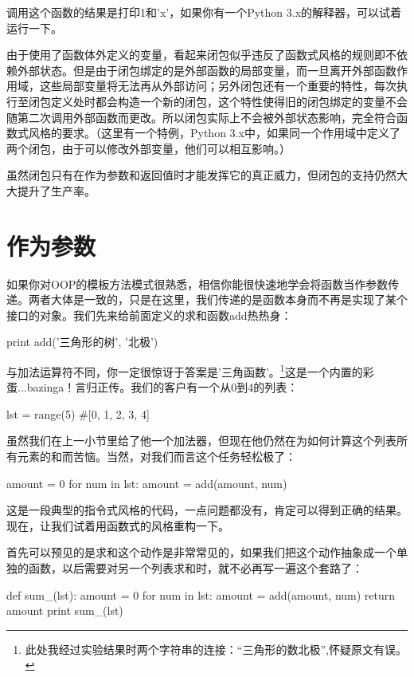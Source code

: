 \documentclass[12pt,a4paper]{report}
\begin{document}
调用这个函数的结果是打印1和'x'，如果你有一个Python 3.x的解释器，可以试着运行一下。

由于使用了函数体外定义的变量，看起来闭包似乎违反了函数式风格的规则即不依赖外部状态。但是由于闭包绑定的是外部函数的局部变量，而一旦离开外部函数作用域，这些局部变量将无法再从外部访问；另外闭包还有一个重要的特性，每次执行至闭包定义处时都会构造一个新的闭包，这个特性使得旧的闭包绑定的变量不会随第二次调用外部函数而更改。所以闭包实际上不会被外部状态影响，完全符合函数式风格的要求。（这里有一个特例，Python 3.x中，如果同一个作用域中定义了两个闭包，由于可以修改外部变量，他们可以相互影响。）

虽然闭包只有在作为参数和返回值时才能发挥它的真正威力，但闭包的支持仍然大大提升了生产率。
\section{作为参数}
如果你对OOP的模板方法模式很熟悉，相信你能很快速地学会将函数当作参数传递。两者大体是一致的，只是在这里，我们传递的是函数本身而不再是实现了某个接口的对象。我们先来给前面定义的求和函数add热热身： 
\begin{python}[moreemph={[4]42},caption={},label=ex1]
print add('三角形的树', '北极')
\end{python}

与加法运算符不同，你一定很惊讶于答案是'三角函数'。\footnote{此处我经过实验结果时两个字符串的连接：“三角形的数北极”,怀疑原文有误。}这是一个内置的彩蛋...bazinga！言归正传。我们的客户有一个从0到4的列表： 
\begin{python}[moreemph={[4]42},caption={},label=ex1]
lst = range(5) #[0, 1, 2, 3, 4]
\end{python}

虽然我们在上一小节里给了他一个加法器，但现在他仍然在为如何计算这个列表所有元素的和而苦恼。当然，对我们而言这个任务轻松极了：
\begin{python}[moreemph={[4]42},caption={},label=ex1]
amount = 0
for num in lst:
    amount = add(amount, num)
\end{python}

这是一段典型的指令式风格的代码，一点问题都没有，肯定可以得到正确的结果。现在，让我们试着用函数式的风格重构一下。

首先可以预见的是求和这个动作是非常常见的，如果我们把这个动作抽象成一个单独的函数，以后需要对另一个列表求和时，就不必再写一遍这个套路了： 
\newpage
\begin{python}[moreemph={[4]42},caption={},label=ex1]
def sum_(lst):
    amount = 0
    for num in lst:
        amount = add(amount, num)
        return amount 
    print sum_(lst)
\end{python}
\end{document}
